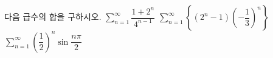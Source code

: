 다음 급수의 합을 구하시오.
 $\displaystyle\sum_{n=1}^{\infty}\dfrac{1+2^{n}}{4^{n-1}}$
 $\displaystyle\sum_{n=1}^{\infty}\left\{(2^{n}-1)\left(-\dfrac{1}{3}\right)^{n}\right\}$
 $\displaystyle\sum_{n=1}^{\infty}\left(\dfrac{1}{2}\right)^{n}\sin\dfrac{n\pi}{2}$
